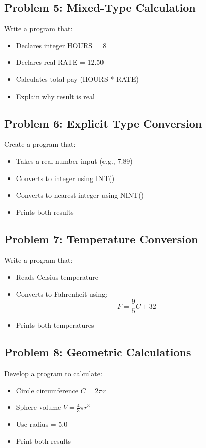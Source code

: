 \documentclass{book}
\begin{document}
\subsection*{Problem 5: Mixed-Type Calculation}
Write a program that:
\begin{itemize}
    \item Declares integer HOURS = 8
    \item Declares real RATE = 12.50
    \item Calculates total pay (HOURS * RATE)
    \item Explain why result is real
\end{itemize}

\subsection*{Problem 6: Explicit Type Conversion}
Create a program that:
\begin{itemize}
    \item Takes a real number input (e.g., 7.89)
    \item Converts to integer using INT()
    \item Converts to nearest integer using NINT()
    \item Prints both results
\end{itemize}

\subsection*{Problem 7: Temperature Conversion}
Write a program that:
\begin{itemize}
    \item Reads Celsius temperature
    \item Converts to Fahrenheit using:
    \[ F = \frac{9}{5}C + 32 \]
    \item Prints both temperatures
\end{itemize}

\subsection*{Problem 8: Geometric Calculations}
Develop a program to calculate:
\begin{itemize}
    \item Circle circumference \( C = 2\pi r \)
    \item Sphere volume \( V = \frac{4}{3}\pi r^3 \)
    \item Use radius = 5.0
    \item Print both results
\end{itemize}
\end{document}
